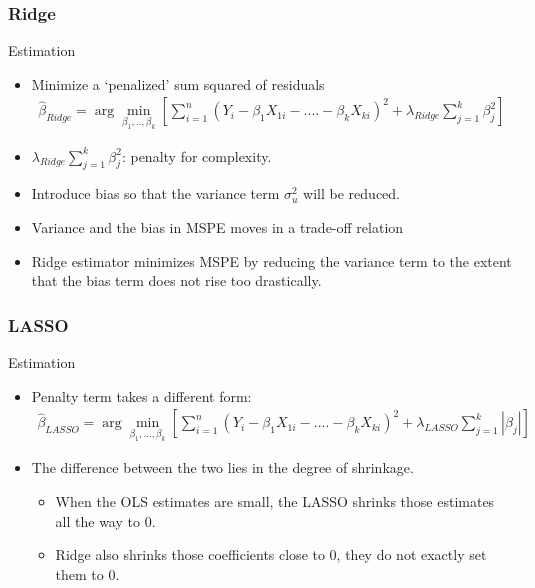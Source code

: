 \begin{frame}
\frametitle{Ridge}
Estimation
\begin{itemize}
\item Minimize a `penalized' sum squared of residuals
\begin{align*}
\hat{\beta}_{Ridge}=\arg\min_{\beta_{1},..,\beta_k}\left[ \sum_{i=1}^n(Y_{i} - \beta_{1}X_{1i}-....-\beta_kX_{ki})^{2} + \lambda_{Ridge}\sum_{j=1}^k\beta_j^{2}\right]
\end{align*}
\item $\lambda_{Ridge}\sum_{j=1}^k\beta_j^{2}$: penalty for complexity. 
\item Introduce bias so that the variance term $\sigma_u^{2}$ will be reduced.
\item Variance and the bias in MSPE moves in a trade-off relation 
\item Ridge estimator minimizes MSPE by reducing the variance term to the extent that the bias term does not rise too drastically. 
\end{itemize}
\end{frame}


\begin{frame}
\frametitle{LASSO}
Estimation
\begin{itemize}
\item Penalty term takes a different form: 
\begin{align*}
\hat{\beta}_{LASSO}=\arg\min_{\beta_{1},...,\beta_k}\left[ \sum_{i=1}^n(Y_{i} - \beta_{1}X_{1i}-....-\beta_kX_{ki})^{2} + \lambda_{LASSO}\sum_{j=1}^k |\beta_j|\right]
\end{align*}
\item The difference between the two lies in the degree of shrinkage. 
\begin{itemize}
\item When the OLS estimates are small, the LASSO shrinks those estimates all the way to 0. 
\item Ridge also shrinks those coefficients close to 0, they do not exactly set them to 0. 
\end{itemize}
\end{itemize}
\end{frame}


